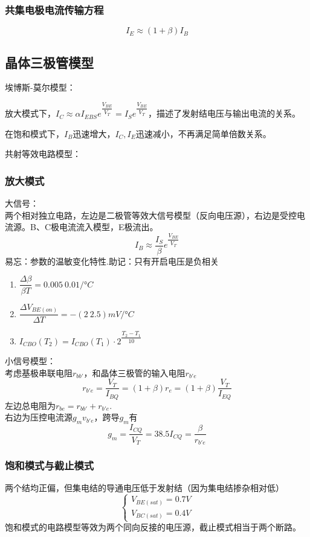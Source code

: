 \documentclass{ctexart}
\begin{document}
\subsubsection{共集电极电流传输方程}
\begin{equation}
    I_E\approx(1+\beta)I_B
\end{equation}
\subsection{晶体三极管模型}
埃博斯-莫尔模型：

放大模式下，$I_C\approx\alpha I_{EBS}e^{\dfrac{V_{BE}}{V_T}}=I_S e^{\dfrac{V_{BE}}{V_T}}$，描述了发射结电压与输出电流的关系。
 
在饱和模式下，$I_B$迅速增大，$I_C,I_E$迅速减小，不再满足简单倍数关系。

共射等效电路模型：
\subsubsection{放大模式}
大信号：\\
两个相对独立电路，左边是二极管等效大信号模型（反向电压源），右边是受控电流源。B、C极电流流入模型，E极流出。
\begin{equation}
    I_B\approx\dfrac{I_S}{\beta}e^{\dfrac{V_{BE}}{V_T}}
\end{equation}
{\color{Red}易忘：参数的温敏变化特性.助记：只有开启电压是负相关}
\begin{enumerate}
    \item $\dfrac{\Delta \beta}{\beta T}=0.005~0.01/°C$
    \item $\dfrac{\Delta V_{BE(on)}}{\Delta T}=-(2~2.5)mV/°C$
    \item $I_{CBO}(T_2)=I_{CBO}(T_1)\cdot 2^{\dfrac{T_2-T_1}{10}}$
\end{enumerate}
小信号模型：\\
考虑基极串联电阻$r_{bb'}$，和晶体三极管的输入电阻$r_{b'e}$
\begin{equation}
    r_{b'e}=\dfrac{V_T}{I_{BQ}}=(1+\beta)r_e=(1+\beta)\dfrac{V_T}{I_{EQ}}
\end{equation}
左边总电阻为$r_{be}=r_{bb'}+r_{b'e}$.\\
右边为压控电流源$g_mv_{b'e}$，跨导$g_m$有
\begin{equation}
    g_m=\dfrac{I_{CQ}}{V_T}=38.5I_{CQ}=\dfrac{\beta}{r_{b'e}}
\end{equation}
\subsubsection{饱和模式与截止模式}
两个结均正偏，但集电结的导通电压低于发射结（因为集电结掺杂相对低）
\begin{equation}
\begin{cases}
        V_{BE(sat)}=0.7V\\
        V_{BC(sat)}=0.4V
\end{cases}
\end{equation}
饱和模式的电路模型等效为两个同向反接的电压源，截止模式相当于两个断路。
\end{document}
